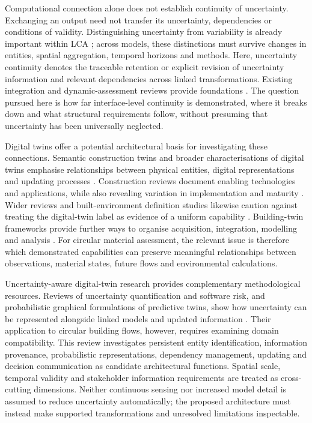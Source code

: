 Computational connection alone does not establish continuity of uncertainty. Exchanging an output need not transfer its uncertainty, dependencies or conditions of validity. Distinguishing uncertainty from variability is already important within LCA \citep{I25}; across models, these distinctions must survive changes in entities, spatial aggregation, temporal horizons and methods. Here, uncertainty continuity denotes the traceable retention or explicit revision of uncertainty information and relevant dependencies across linked transformations. Existing integration and dynamic-assessment reviews provide foundations \citep{I35,U14}. The question pursued here is how far interface-level continuity is demonstrated, where it breaks down and what structural requirements follow, without presuming that uncertainty has been universally neglected.

Digital twins offer a potential architectural basis for investigating these connections. Semantic construction twins and broader characterisations of digital twins emphasise relationships between physical entities, digital representations and updating processes \citep{I26,I27}. Construction reviews document enabling technologies and applications, while also revealing variation in implementation and maturity \citep{I28,I29}. Wider reviews and built-environment definition studies likewise caution against treating the digital-twin label as evidence of a uniform capability \citep{I30,I31}. Building-twin frameworks provide further ways to organise acquisition, integration, modelling and analysis \citep{I34}. For circular material assessment, the relevant issue is therefore which demonstrated capabilities can preserve meaningful relationships between observations, material states, future flows and environmental calculations.

Uncertainty-aware digital-twin research provides complementary methodological resources. Reviews of uncertainty quantification and software risk, and probabilistic graphical formulations of predictive twins, show how uncertainty can be represented alongside linked models and updated information \citep{I32,I33}. Their application to circular building flows, however, requires examining domain compatibility. This review investigates persistent entity identification, information provenance, probabilistic representations, dependency management, updating and decision communication as candidate architectural functions. Spatial scale, temporal validity and stakeholder information requirements are treated as cross-cutting dimensions. Neither continuous sensing nor increased model detail is assumed to reduce uncertainty automatically; the proposed architecture must instead make supported transformations and unresolved limitations inspectable.

